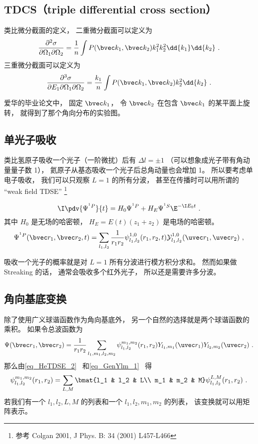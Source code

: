 \subsection{TDCS（triple differential cross section）}
类比微分截面的定义， 二重微分截面可以定义为
\begin{equation}
\frac{\partial^2\sigma}{\partial\Omega_1\partial\Omega_2} = \frac{1}{n} \int P(\bvec k_1, \bvec k_2)k_1^2k_2^2\dd{k_1}\dd{k_2}~.
\end{equation}
三重微分截面可以定义为
\begin{equation}\label{eq_HeAnal_23}
\frac{\partial^3\sigma}{\partial E_1\partial\Omega_1\partial\Omega_2} = \frac{k_1}{n} \int P(\bvec k_1, \bvec k_2)k_2^2\dd{k_2}~.
\end{equation}

爱华的毕业论文中， 固定 $\bvec k_1$， 令 $\bvec k_2$ 在包含 $\bvec k_1$ 的某平面上旋转， 就得到了那个角向分布的实验图。

\subsection{单光子吸收}

类比氢原子吸收一个光子（一阶微扰）后有 $\Delta l = \pm 1$ （可以想象成光子带有角动量量子数 1）， 氦原子从基态吸收一个光子后总角动量也会增加 1。 所以要考虑单电子吸收， 我们可以只观察 $L = 1$ 的所有分波， 甚至在传播时可以用所谓的 “weak field TDSE” \footnote{参考 Colgan 2001, J Phys. B: 34 (2001) L457-L466}

\begin{equation}
\I \pdv{\Psi^{^1P}}{t} = H_0 \Psi^{^1P} + H_E \Psi^{^1S} \E^{-\I E_0 t}~.
\end{equation}
其中 $H_0$ 是无场的哈密顿， $H_E = E(t) (z_1 + z_2)$ 是电场的哈密顿。
\begin{equation}
\Psi^{^1P}(\bvec r_1, \bvec r_2, t) = \sum_{l_1, l_2} \frac{1}{r_1 r_2} \psi_{l_1, l_2}^{1, 0} (r_1, r_2, t) \mathcal Y_{l_1, l_2}^{1, 0} (\uvec r_1, \uvec r_2)~,
\end{equation}

吸收一个光子的概率就是对 $L = 1$ 所有分波进行模方积分求和。 然而如果做 Streaking 的话， 通常会吸收多个红外光子， 所以还是需要许多分波。

\subsection{角向基底变换}
除了使用广义球谐函数作为角向基底外， 另一个自然的选择就是两个球谐函数的乘积。 如果令总波函数为
\begin{equation}\label{eq_HeAnal_6}
\Psi(\bvec r_1, \bvec r_2) = \frac{1}{r_1 r_2} \sum_{l_1, m_1, l_2, m_2} \psi_{l_1, l_2}^{m_1, m_2}(r_1, r_2) Y_{l_1, m_1}(\uvec r_1) Y_{l_2, m_2} (\uvec r_2)~.
\end{equation}
那么由\autoref{eq_HeTDSE_2}~ 和\autoref{eq_GenYlm_1}~ 得
\begin{equation}\label{eq_HeAnal_7}
\psi_{l_1, l_2}^{m_1, m_2}(r_1, r_2) = \sum_{L,M} \bmat{l_1 & l_2 & L\\ m_1 & m_2 & M} \psi_{l_1, l_2}^{L,M}(r_1, r_2)~.
\end{equation}
若我们有一个 $l_1, l_2, L, M$ 的列表和一个 $l_1, l_2, m_1, m_2$ 的列表， 该变换就可以用矩阵表示。

